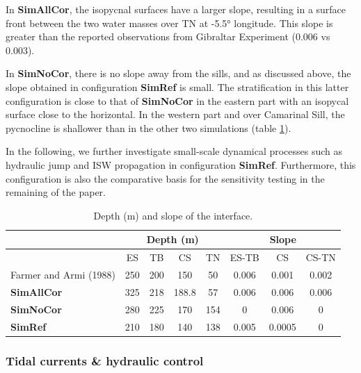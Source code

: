 \documentclass[a4paper,12pt]{article}
\begin{document}
In \textbf{SimAllCor}, the isopycnal surfaces have a larger slope, resulting in a surface front between the two water masses over TN at -5.5° longitude. This slope is greater than the reported observations from Gibraltar Experiment (0.006 vs 0.003).

In \textbf{SimNoCor}, there is no slope away from the sills, and as discussed above, the slope obtained in configuration \textbf{SimRef} is small. The stratification in this latter configuration is close to that of \textbf{SimNoCor} in the eastern part with an isopycal surface close to the horizontal. In the western part and over Camarinal Sill, the pycnocline is shallower than in the other two simulations (table \ref{tabdepth}).

In the following, we further investigate small-scale dynamical processes such as hydraulic jump and ISW propagation in configuration \textbf{SimRef}. Furthermore, this configuration is also the comparative basis for the sensitivity testing in the remaining of the paper.

\begin{table}[!h]
 \centering
  \begin{tabular}{|l|c|c|c|c||c|c|c|}
 \hline
  & \multicolumn{4}{c||}{Depth (m)} & \multicolumn{3}{c|}{Slope}\\
  \hline
    & ES & TB & CS & TN& ES-TB & CS & CS-TN\\
   \hline
   Farmer and Armi (1988) & 250 & 200 & 150 & 50 & 0.006 & 0.001 & 0.002\\
   \hline
   \textbf{SimAllCor} & 325 & 218 & 188.8 & 57 & 0.006 & 0.006 & 0.006\\
   \hline
   \textbf{SimNoCor} & 280 & 225 & 170 & 154& 0 & 0.006 & 0\\
   \hline
   \textbf{SimRef} & 210 & 180 & 140 & 138 & 0.005 & 0.0005 & 0\\
  \hline
 \end{tabular}
 \caption{Depth (m) and slope of the interface.}
 \label{tabdepth}
\end{table}

 
\subsubsection{Tidal currents \& hydraulic control}

\end{document}
